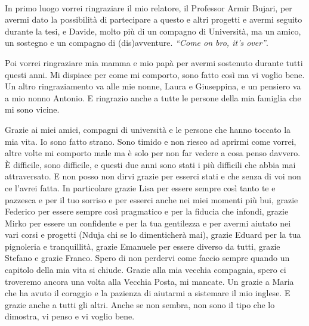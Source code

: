 \cleardoublepage
{}
\thispagestyle{empty}


\begingroup
\let\clearpage\relax
\let\cleardoublepage\relax
\let\cleardoublepage\relax


\\

\noindent
In primo luogo vorrei ringraziare il mio relatore, il Professor Armir Bujari,
per avermi dato la possibilità di partecipare a questo e altri progetti e
avermi seguito durante la tesi, e Davide, molto più di un compagno di
Università, ma un amico, un sostegno e un compagno di (dis)avventure.
\emph{``Come on bro, it's over''}.

\vspace*{0.4cm}

\noindent
Poi vorrei ringraziare mia mamma e mio papà per avermi sostenuto durante tutti
questi anni. Mi dispiace per come mi comporto, sono fatto così ma vi voglio
bene. Un altro ringraziamento va alle mie nonne, Laura e Giuseppina, e un
pensiero va a mio nonno Antonio. E ringrazio anche a tutte le persone della mia
famiglia che mi sono vicine.

\vspace*{0.4cm}

\noindent
Grazie ai miei amici, compagni di università e le persone che hanno
toccato la mia vita. Io sono fatto strano. Sono timido e non riesco ad aprirmi
come vorrei, altre volte mi comporto male ma è solo per non far vedere a cosa
penso davvero. È difficile, sono difficile, e questi due anni sono stati i più
difficili che abbia mai attraversato. E non posso non dirvi grazie per esserci
stati e che senza di voi non ce l'avrei fatta. In particolare grazie Lisa per
essere sempre così tanto te e pazzesca e per il tuo sorriso e per esserci anche
nei miei momenti più bui, grazie Federico per essere sempre così pragmatico e
per la fiducia che infondi, grazie Mirko per essere un confidente e per la tua
gentilezza e per avermi aiutato nei vari corsi e progetti (Nduja chi se lo
dimenticherà mai), grazie Eduard per la tua pignoleria e tranquillità, grazie
Emanuele per essere diverso da tutti, grazie Stefano e grazie Franco. Spero di
non perdervi come faccio sempre quando un capitolo della mia vita si chiude.
Grazie alla mia vecchia compagnia, spero ci troveremo ancora una volta alla
Vecchia Posta, mi mancate. Un grazie a Maria che ha avuto il coraggio e la
pazienza di aiutarmi a sistemare il mio inglese. E grazie anche a tutti gli
altri. Anche se non sembra, non sono il tipo che lo dimostra, vi penso e vi
voglio bene.

